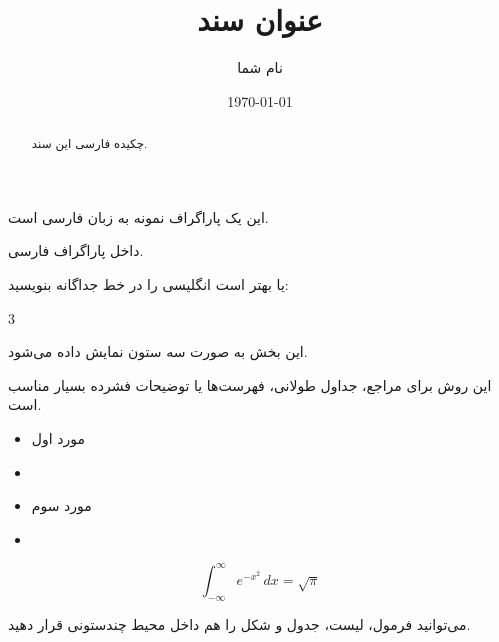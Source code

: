 \documentclass[%
10pt,               %
a4paper,
twoside             %
]{article}
\title{عنوان سند}
\author{نام شما}
\date{\today}
\begin{document}
	
	\maketitle
	
	\begin{abstract}
		چکیده فارسی این سند.
		
	\end{abstract}
	
	
	این یک پاراگراف نمونه به زبان فارسی است.
	
	 داخل پاراگراف فارسی.
	
	یا بهتر است انگلیسی را در خط جداگانه بنویسید:
	
	
	
	\begin{multicols}{3}
		
		این بخش به صورت سه ستون نمایش داده می‌شود.
		
		این روش برای مراجع، جداول طولانی، فهرست‌ها یا توضیحات فشرده بسیار مناسب است.
		
		
		
		\begin{itemize}
			\item مورد اول
			\item {}
			\item مورد سوم
			\item {}
		\end{itemize}
		
		\begin{equation*}
			\int_{-\infty}^{\infty} e^{-x^2} \, dx = \sqrt{\pi}
		\end{equation*}
		
		می‌توانید فرمول، لیست، جدول و شکل را هم داخل محیط چندستونی قرار دهید.
		
	\end{multicols}
	
\end{document}
